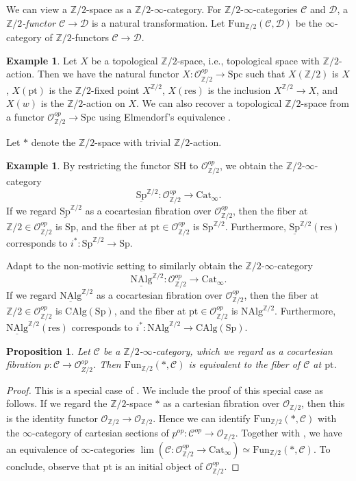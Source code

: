 \documentclass[10pt]{amsart}
\newtheorem{prop}[thm]{Proposition}
\theoremstyle{definition}
\newtheorem{exm}[thm]{Example}
\numberwithin{equation}{section}
\newcommand{\Z}{\mathbb{Z}}
\newcommand{\cC}{\mathcal{C}}
\newcommand{\cD}{\mathcal{D}}
\newcommand{\cO}{\mathcal{O}}
\newcommand{\ul}{\underline}
\newcommand{\pt}{\mathrm{pt}}
\newcommand{\CAlg}{\mathrm{CAlg}}
\newcommand{\Fun}{\mathrm{Fun}}
\newcommand{\NAlg}{\mathrm{NAlg}}
\newcommand{\Sp}{\mathrm{Sp}}
\newcommand{\Spc}{\mathrm{Spc}}
\newcommand{\Cat}{\mathrm{Cat}}
\newcommand{\res}{\mathrm{res}}
\begin{document}
We can view a $\Z/2$-space as a $\Z/2$-$\infty$-category.
For $\Z/2$-$\infty$-categories $\cC$ and $\cD$,
a \emph{$\Z/2$-functor $\cC\to \cD$} is a natural transformation.
Let $\Fun_{\Z/2}(\cC,\cD)$ be the $\infty$-category of $\Z/2$-functors $\cC\to \cD$.

\begin{exm}
Let $X$ be a topological $\Z/2$-space, i.e., topological space with $\Z/2$-action.
Then we have the natural functor $X\colon \cO_{\Z/2}^{op}\to \Spc$ such that $X(\Z/2)$ is $X$, $X(\pt)$ is the $\Z/2$-fixed point $X^{\Z/2}$,
$X(\res)$ is the inclusion $X^{\Z/2}\to X$,
and $X(w)$ is the $\Z/2$-action on $X$.
We can also recover a topological $\Z/2$-space from a functor $\cO_{\Z/2}^{op}\to \Spc$ using Elmendorf's equivalence \cite[Theorem 8.8.1]{HHR21}.

Let $*$ denote the $\Z/2$-space with trivial $\Z/2$-action.
\end{exm}



\begin{exm}
By restricting the functor $\mathrm{SH}$ to $\cO_{\Z/2}^{op}$,
we obtain the $\Z/2$-$\infty$-category
\[
\ul{\Sp}^{\Z/2}
\colon
\cO_{\Z/2}^{op}
\to
\Cat_\infty.
\]
If we regard $\ul{\Sp}^{\Z/2}$ as a cocartesian fibration over $\cO_{\Z/2}^{op}$,
then the fiber at $\Z/2\in \cO_{\Z/2}^{op}$ is $\Sp$,
and the fiber at $\pt\in \cO_{\Z/2}^{op}$ is $\Sp^{\Z/2}$.
Furthermore, $\ul{\Sp}^{\Z/2}(\res)$ corresponds to $i^*\colon \Sp^{\Z/2}\to \Sp$.

Adapt \cite[Example 8.7]{BH21} to the non-motivic setting to similarly obtain the $\Z/2$-$\infty$-category
\[
\ul{\NAlg}^{\Z/2}
\colon
\cO_{\Z/2}^{op}
\to
\Cat_\infty.
\]
If we regard $\ul{\NAlg}^{\Z/2}$ as a cocartesian fibration over $\cO_{\Z/2}^{op}$,
then the fiber at $\Z/2\in \cO_{\Z/2}^{op}$ is $\CAlg(\Sp)$,
and the fiber at $\pt\in \cO_{\Z/2}^{op}$ is $\NAlg^{\Z/2}$.
Furthermore, $\ul{\NAlg}^{\Z/2}(\res)$ corresponds to $i^*\colon \NAlg^{\Z/2}\to \CAlg(\Sp)$.
\end{exm}

\begin{prop}
\label{G-cat.2}
Let $\cC$ be a $\Z/2$-$\infty$-category,
which we regard as a cocartesian fibration $p\colon \cC\to \cO_{Z/2}^{op}$.
Then $\Fun_{\Z/2}(*,\cC)$ is equivalent to the fiber of $\cC$ at $\pt$.
\end{prop}
\begin{proof}
This is a special case of \cite[Lemma 2.12]{1608.03657}. We include the proof of this special case as follows.
If we regard the $\Z/2$-space $*$ as a cartesian fibration over $\cO_{\Z/2}$,
then this is the identity functor $\cO_{\Z/2}\to \cO_{\Z/2}$.
Hence we can identify $\Fun_{\Z/2}(*,\cC)$ with the $\infty$-category of cartesian sections of $p^{op}\colon \cC^{op}\to \cO_{\Z/2}$.
Together with \cite[Corollary 3.3.3.2]{HTT},
we have an equivalence of $\infty$-categories $\lim(\cC \colon \cO_{\Z/2}^{op}\to \Cat_\infty)\simeq \Fun_{\Z/2}(*,\cC)$.
To conclude,
observe that $\pt$ is an initial object of $\cO_{\Z/2}^{op}$.
\end{proof}
\end{document}
